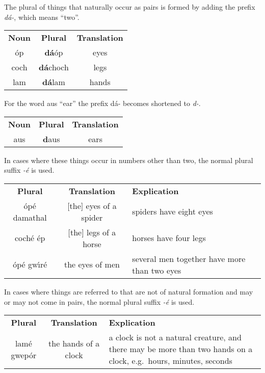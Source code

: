 The plural of things that naturally occur as pairs is formed by adding the prefix \textit{d\'{a}-}, which means ``two''.
\begin{table}[H]
\centering
\begin{tabular}{ccc}
  \toprule
  \textbf{Noun} & \textbf{Plural} & \textbf{Translation}\\
  \cmidrule(lr){1-1}\cmidrule(lr){2-2}\cmidrule(lr){3-3}
  \'{o}p & \textbf{d\'{a}}\'{o}p & eyes\\
  coch & \textbf{d\'{a}}choch & legs\\
  lam & \textbf{d\'{a}}lam & hands\\
  \bottomrule
\end{tabular}
\label{example_plural_of_natural_pairs}
\end{table}

For the word aus ``ear'' the prefix d\'{a}- becomes shortened to \textit{d-}.
\begin{table}[H]
\centering
\begin{tabular}{ccc}
  \toprule
  \textbf{Noun} & \textbf{Plural} & \textbf{Translation}\\
  \cmidrule(lr){1-1}\cmidrule(lr){2-2}\cmidrule(lr){3-3}
  aus & \textbf{d}aus & ears\\
  \bottomrule
\end{tabular}
\label{example_plural_of_ear}
\end{table}

In cases where these things occur in numbers other than two, the normal plural suffix \textit{-\'{e}} is used.
\begin{table}[H]
\centering
\begin{tabular}{ccM{10.0cm}}
  \toprule
  \textbf{Plural} & \textbf{Translation} & \textbf{Explication}\\
  \cmidrule(lr){1-1}\cmidrule(lr){2-2}\cmidrule(lr){3-3}
  \'{o}p\'{e} damathal & $[$the$]$ eyes of a spider & spiders have eight eyes\\
  coch\'{e} \'{e}p & $[$the$]$ legs of a horse & horses have four legs\\
  \'{o}p\'{e} gw\'{\i}r\'{e} & the eyes of men & several men together have more than two eyes\\
  \bottomrule
\end{tabular}
\label{example_plural_more_than_two}
\end{table}

In cases where things are referred to that are not of natural formation and may or may not come in pairs, the normal plural suffix \textit{-\'{e}} is used.
\begin{table}[H]
\centering
\begin{tabular}{ccM{10.0cm}}
  \toprule
  \textbf{Plural} & \textbf{Translation} & \textbf{Explication}\\
  \cmidrule(lr){1-1}\cmidrule(lr){2-2}\cmidrule(lr){3-3}
  lam\'{e} gwep\'{o}r & the hands of a clock & a clock is not a natural creature, and there may be more than two hands on a clock, e.g.\ hours, minutes, seconds\\
  \bottomrule
\end{tabular}
\label{example_plural_may_or_not}
\end{table}

